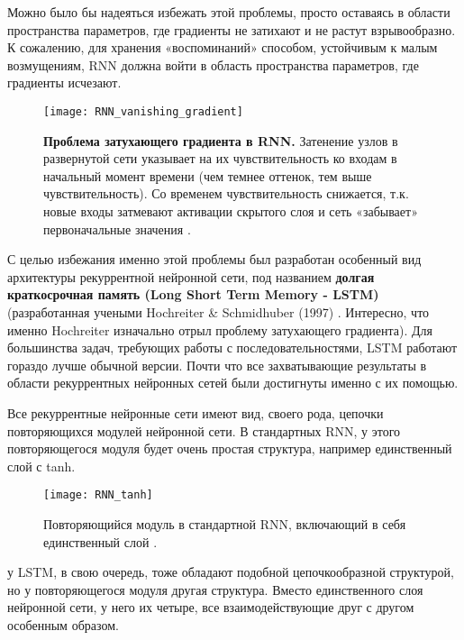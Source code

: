 Можно было бы надеяться избежать этой проблемы, просто оставаясь в области пространства
параметров, где градиенты не затихают и не растут взрывообразно. К сожалению,
для хранения «воспоминаний» способом, устойчивым к малым возмущениям, RNN
должна войти в область пространства параметров, где градиенты исчезают.

\begin{figure}[h!]
    \centering
    \texttt{[image: RNN\_vanishing\_gradient]}
    \caption{\textbf{Проблема затухающего градиента в RNN.} Затенение узлов в 
    развернутой сети указывает на их чувствительность ко входам в начальный момент 
    времени (чем темнее оттенок, тем выше чувствительность). Со временем 
    чувствительность снижается, т.к. новые входы затмевают активации 
    скрытого слоя и сеть «забывает» первоначальные значения \cite{graves}.}
    \label{fig:RNN_vanishing_gradient}
\end{figure}

С целью избежания именно этой проблемы был разработан особенный 
вид архитектуры рекуррентной нейронной сети, под названием 
\textbf{долгая краткосрочная память (Long Short Term Memory - LSTM)} (разработанная учеными 
Hochreiter \& Schmidhuber (1997) \cite{lstm}. Интересно, что именно Hochreiter 
изначально отрыл проблему затухающего градиента). Для большинства задач, требующих 
работы с последовательностями, LSTM работают гораздо лучше обычной версии. 
Почти что все захватывающие результаты в области рекуррентных нейронных 
сетей были достигнуты именно с их помощью. 


Все рекуррентные нейронные сети имеют вид, своего рода, цепочки 
повторяющихся модулей нейронной сети. В стандартных RNN, у этого 
повторяющегося модуля будет очень простая структура, 
например единственный слой с tanh.  \newpage

\begin{figure}[h!]
    \centering
    \texttt{[image: RNN\_tanh]}
    \caption{Повторяющийся модуль в стандартной RNN, включающий 
    в себя единственный слой \cite{colah2}.}
    \label{fig:RNN_tanh}
\end{figure}

у LSTM, в свою очередь, тоже обладают подобной цепочкообразной структурой, 
но у повторяющегося модуля другая структура. Вместо единственного слоя 
нейронной сети, у него их четыре, все взаимодействующие друг с другом 
особенным образом. 

